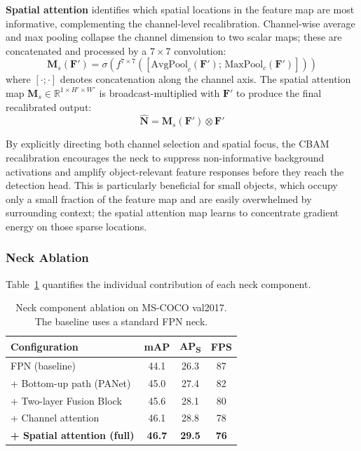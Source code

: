 \textbf{Spatial attention} identifies which spatial locations
in the feature map are most informative, complementing the
channel-level recalibration.  Channel-wise average and max
pooling collapse the channel dimension to two scalar maps;
these are concatenated and processed by a $7 \times 7$
convolution:
\begin{equation}
    \mathbf{M}_s(\mathbf{F}') =
    \sigma\!\left(
        f^{7\times7}\!\left(
        [\text{AvgPool}_c(\mathbf{F}');\,
         \text{MaxPool}_c(\mathbf{F}')]
        \right)
    \right)
    \label{eq:spatial_att}
\end{equation}
where $[\cdot;\cdot]$ denotes concatenation along the channel
axis.  The spatial attention map $\mathbf{M}_s \in \mathbb{R}^{
1 \times H' \times W'}$ is broadcast-multiplied with
$\mathbf{F}'$ to produce the final recalibrated output:
\begin{equation}
    \hat{\mathbf{N}} =
    \mathbf{M}_s\!\left(\mathbf{F}'\right) \otimes \mathbf{F}'
    \label{eq:recalib}
\end{equation}

By explicitly directing both channel selection and spatial
focus, the CBAM recalibration encourages the neck to suppress
non-informative background activations and amplify object-relevant
feature responses before they reach the detection head.  This
is particularly beneficial for small objects, which occupy only
a small fraction of the feature map and are easily overwhelmed
by surrounding context; the spatial attention map learns to
concentrate gradient energy on those sparse locations.

\subsubsection{Neck Ablation}

Table~\ref{tab:neck_ablation} quantifies the individual
contribution of each neck component.

\begin{table}[!t]
\centering
\caption{Neck component ablation on MS-COCO val2017.
The baseline uses a standard FPN neck.}
\label{tab:neck_ablation}
\renewcommand{\arraystretch}{1.15}
\setlength{\tabcolsep}{3pt}
\begin{tabular}{l c c c}
\hline\hline
\textbf{Configuration}   & \textbf{mAP} &
\textbf{AP\textsubscript{S}} & \textbf{FPS} \\
\hline
FPN (baseline)           & 44.1 & 26.3 & 87 \\
+ Bottom-up path (PANet) & 45.0 & 27.4 & 82 \\
+ Two-layer Fusion Block & 45.6 & 28.1 & 80 \\
+ Channel attention      & 46.1 & 28.8 & 78 \\
\textbf{+ Spatial attention (full)} &
\textbf{46.7} & \textbf{29.5} & \textbf{76} \\
\hline\hline
\end{tabular}
\end{table}

